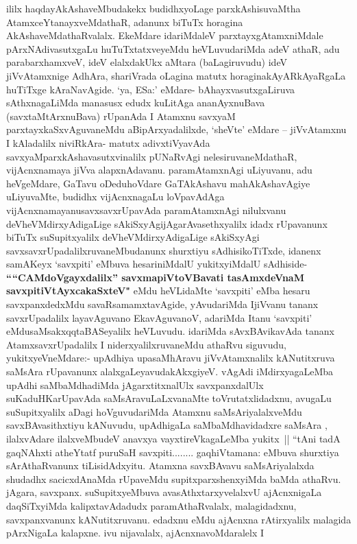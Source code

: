 \begin{artha}
ililx haqdayAkAshaveMbudakekx budidhxyoLage parxkAshisuvaMtha
AtamxceYtanayx\break veMdathaR, adanunx biTuTx horagina
AkAshaveMdathaRvalalx. EkeMdare idariMdaleV parxtayxgAtamxniMdale
pArxNAdivasutxgaLu huTuTxtatxveyeMdu heVLuvudariMda adeV athaR, adu
parabarxhamxveV, ideV elalxdakUkx aMtara (baLagiruvudu) ideV
jiVvAtamxnige AdhAra, shariVrada oLagina matutx horaginakAyARkAyaRgaLa
huTiTxge kAraNavAgide. `ya, ESa:' eMdare- bAhayxvasutxgaLiruva
sAthxnagaLiMda manasusx edudx kuLitAga ananAyxnuBava
(savxtaMtArxnuBava) rUpanAda I Atamxnu savxyaM parxtayxkaSxvAguvaneMdu
aBipArxyadalilxde, `sheVte' eMdare -- jiVvAtamxnu I kAladalilx
niviRkAra- matutx adivxtiVyavAda savxyaMparxkAshavasutxvinalilx
pUNaRvAgi nelesiruvaneMdathaR, vijAcnxnamaya jiVva
alapxnAdavanu. paramAtamxnAgi uLiyuvanu, adu heVgeMdare, 
GaTavu oDeduhoVdare GaTAkAshavu mahAkAshavAgiye uLiyuvaMte, budidhx vijAcnxnagaLu
loVpavAdAga vijAcnxnamayanu\break savxsavxrUpavAda paramAtamxnAgi nilulxvanu
deVheVMdirxyAdigaLige sAkiSxyAgi\break jAgarAvasethxyalilx idadx rUpavanunx
biTuTx suSupitxyalilx deVheVMdirxyAdigaLige
sAkiSxyAgi savxsavxrUpadalilxruvaneMbudanunx shurxtiyu sAdhisikoTiTxde, idanenx
samAKeyx `savxpiti' eMbuva hesariniMdalU yukitxyiMdalU sAdhiside-
\textbf{````CAMdoVgayxdalilx'' savxmapiVtoVBavati  tasAmxdeVnaM
savxpitiVtAyxcakaSxteV"} eMdu heVLidaMte `savxpiti' eMba hesaru
savxpanxdedxMdu savaRsamamxtavAgide, yAvudariMda IjiVvanu tananx
savxrUpadalilx layavAguvano EkavAguvanoV, adariMda Itanu `savxpiti'
eMdu\break saMsakxqqtaBASeyalilx heVLuvudu. idariMda sAvxBAvikavAda tananx
AtamxsavxrUpadalilx I niderxyalilxruvaneMdu
athaRvu siguvudu, yukitxyeVneMdare:- upAdhiya upasaMhAravu
jiVvAtamxnalilx kANutitxruva saMsAra rUpavanunx
alalxgaLeyavudakAkxgiyeV. vAgAdi iMdirxyagaLeMba upAdhi saMbaMdhadiMda
jAgarxtitxnalUlx savxpanxdalUlx suKaduHKarUpavAda saMsAravuLaLxvanaMte
toVrutatxlidadxnu, avugaLu suSupitxyalilx aDagi hoVguvudariMda Atamxnu
saMsAriyalalxveMdu savxBAvasithxtiyu kANuvudu, upAdhigaLa
saMbaMdhavidadxre saMsAra , ilalxvAdare ilalxveMbudeV anavxya
vayxtireVkagaLeMba yukitx~|| ``tAni tadA gaqNAhxti atheYtatf puruSaH
savxpiti........ gaqhiVtamana: eMbuva shurxtiya sArAthaRvanunx
tiLisidAdxyitu. Atamxna savxBAvavu saMsAriyalalxda shudadhx
sacicxdAnaMda rUpaveMdu supitxparxshenxyiMda baMda athaRvu. jAgara,
savxpanx. suSupitxyeMbuva avasAthxtarxyvelalxvU ajAcnxnigaLa
daqSiTxyiMda kalipxtavAdadudx paramAthaRvalalx, malagidadxnu,
savxpanxvanunx kANutitxruvanu. edadxnu eMdu ajAcnxna rAtirxyalilx malagida
pArxNigaLa kalapxne. ivu nijavalalx, ajAcnxnavoMdaralelx I

\end{artha}
